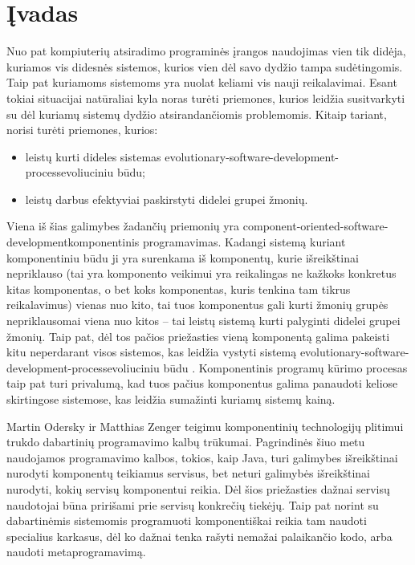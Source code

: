 \chapter{Įvadas}

Nuo pat kompiuterių atsiradimo programinės įrangos naudojimas vien
tik didėja, kuriamos vis didesnės sistemos, kurios vien dėl
savo dydžio tampa sudėtingomis. Taip pat kuriamoms sistemoms yra
nuolat keliami vis nauji reikalavimai. Esant tokiai situacijai
natūraliai kyla noras turėti priemones, kurios leidžia susitvarkyti
su dėl kuriamų sistemų dydžio atsirandančiomis problemomis. Kitaip
tariant, norisi turėti priemones, kurios:
\begin{itemize}
  \item leistų kurti dideles sistemas
    \gls{evolutionary-software-development-process}{evoliuciniu būdu};
  \item leistų darbus efektyviai paskirstyti didelei grupei žmonių.
\end{itemize}

Viena iš šias galimybes žadančių priemonių yra
\gls{component-oriented-software-development}{komponentinis programavimas}.
Kadangi sistemą kuriant komponentiniu būdu ji yra surenkama iš
komponentų, kurie išreikštinai nepriklauso (tai yra komponento
veikimui yra reikalingas ne kažkoks konkretus kitas komponentas, o
bet koks komponentas, kuris tenkina tam tikrus reikalavimus) vienas nuo
kito, tai tuos komponentus gali kurti žmonių grupės nepriklausomai
viena nuo kitos – tai leistų sistemą kurti palyginti didelei grupei
žmonių. Taip pat, dėl tos pačios priežasties vieną komponentą galima
pakeisti kitu neperdarant visos sistemos, kas leidžia vystyti
sistemą \gls{evolutionary-software-development-process}{evoliuciniu būdu}%
\cite[6]{cs-beyond-object-oriented-programming}. Komponentinis programų
kūrimo procesas taip pat turi privalumą, kad tuos pačius komponentus
galima panaudoti keliose skirtingose sistemose, kas leidžia sumažinti
kuriamų sistemų kainą\cite[6]{cs-beyond-object-oriented-programming}.

Martin Odersky ir Matthias Zenger teigimu komponentinių technologijų
plitimui trukdo dabartinių programavimo kalbų
trūkumai\cite{scalable-component-abstractions, odersky:scala-experiment}.
Pagrindinės šiuo metu naudojamos programavimo kalbos, tokios, kaip
Java, turi galimybes išreikštinai nurodyti komponentų teikiamus
servisus, bet neturi galimybės išreikštinai nurodyti, kokių servisų
komponentui reikia. Dėl šios priežasties dažnai servisų naudotojai
būna pririšami prie servisų konkrečių
tiekėjų\cite{scalable-component-abstractions}. Taip pat norint
su dabartinėmis sistemomis programuoti komponentiškai reikia
tam naudoti specialius karkasus, dėl ko dažnai tenka rašyti
nemažai palaikančio  kodo, arba naudoti
metaprogramavimą\cite{extensible-software-components}.



